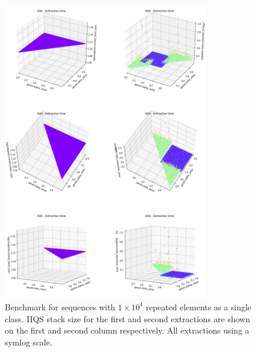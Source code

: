 \begin{figure}[!ht]
    \centering
    \includegraphics[width=0.8\textwidth]{./fragments/04_experimental_execution/images/04_alphabeta_singleclass_stack.png}
    \caption{Benchmark for sequences with $1\times10^4$ repeated elements as a single class. IIQS stack size for the first and second extractions are shown on the first and second column respectively. All extractions using a symlog scale.}
    \label{FIG:05_ALPHABETA_RELATIONSHIP_SINGLECLASS_STACK}
\end{figure}




\FloatBarrier
